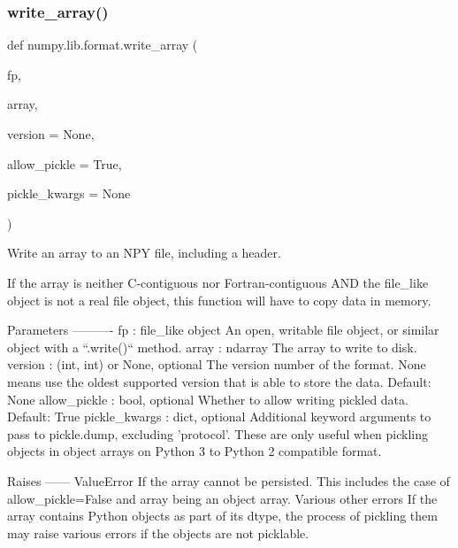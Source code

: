 \subsubsection{\texorpdfstring{write\+\_\+array()}{write\_array()}}
{\footnotesize\ttfamily def numpy.\+lib.\+format.\+write\+\_\+array (\begin{DoxyParamCaption}\item[{}]{fp,  }\item[{}]{array,  }\item[{}]{version = {\ttfamily None},  }\item[{}]{allow\+\_\+pickle = {\ttfamily True},  }\item[{}]{pickle\+\_\+kwargs = {\ttfamily None} }\end{DoxyParamCaption})}

\begin{DoxyVerb}Write an array to an NPY file, including a header.

If the array is neither C-contiguous nor Fortran-contiguous AND the
file_like object is not a real file object, this function will have to
copy data in memory.

Parameters
----------
fp : file_like object
    An open, writable file object, or similar object with a
    ``.write()`` method.
array : ndarray
    The array to write to disk.
version : (int, int) or None, optional
    The version number of the format. None means use the oldest
    supported version that is able to store the data.  Default: None
allow_pickle : bool, optional
    Whether to allow writing pickled data. Default: True
pickle_kwargs : dict, optional
    Additional keyword arguments to pass to pickle.dump, excluding
    'protocol'. These are only useful when pickling objects in object
    arrays on Python 3 to Python 2 compatible format.

Raises
------
ValueError
    If the array cannot be persisted. This includes the case of
    allow_pickle=False and array being an object array.
Various other errors
    If the array contains Python objects as part of its dtype, the
    process of pickling them may raise various errors if the objects
    are not picklable.\end{DoxyVerb}
 \mbox{\label{namespacenumpy_1_1lib_1_1format_a748ba757811ac4173ff949c21a457b12}} 
